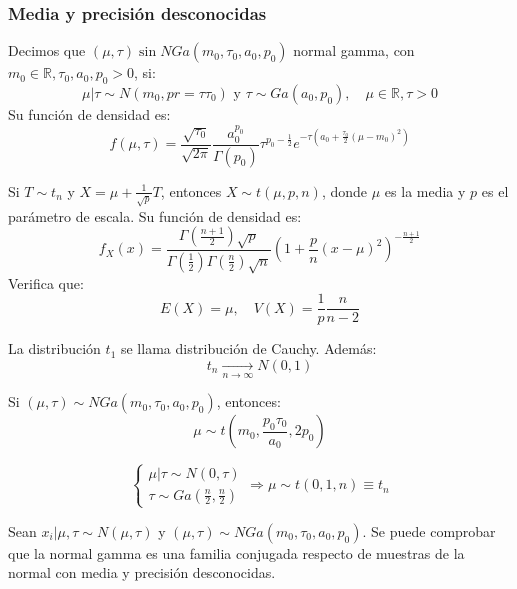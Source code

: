 \subsubsection*{Media y precisión desconocidas}
\begin{definition}
    Decimos que $(\mu, \tau) \sin NGa(m_0, \tau_0, a_0, p_0)$ normal gamma, con $m_0 \in \mathbb{R}, \tau_0, a_0, p_0 > 0$, si:
    $$\mu|\tau \sim N(m_0, pr = \tau\tau_0) \text{ y } \tau \sim Ga(a_0, p_0), \quad \mu \in \mathbb{R}, \tau > 0$$
    Su función de densidad es:
    $$f(\mu, \tau) = \frac{\sqrt{\tau_0}}{\sqrt{2\pi}} \frac{a_0^{p_0}}{\Gamma(p_0)} \tau^{p_0 - \frac{1}{2}} e^{-\tau \left(a_0 + \frac{\tau_0}{2}(\mu-m_0)^2\right)}$$
\end{definition}

\begin{definition}
    Si $T \sim t_n$ y $X = \mu + \frac{1}{\sqrt{p}}T$, entonces $X \sim t(\mu, p, n)$, donde $\mu$ es la media y $p$ es el parámetro de escala.
    Su función de densidad es:
    $$f_X(x) = \frac{\Gamma\left(\frac{n+1}{2}\right)\sqrt{p}}{\Gamma\left(\frac{1}{2}\right)\Gamma\left(\frac{n}{2}\right)\sqrt{n}} \left(1 + \frac{p}{n}(x-\mu)^2\right)^{-\frac{n+1}{2}}$$
    Verifica que:
    $$E(X) = \mu, \quad V(X) = \frac{1}{p} \frac{n}{n-2}$$
\end{definition}

\begin{remark}
    La distribución $t_1$ se llama distribución de Cauchy.
    Además:
    $$t_n \xrightarrow[n \to \infty]{} N(0, 1)$$
\end{remark}

\begin{theorem}
    Si $(\mu, \tau) \sim NGa(m_0, \tau_0, a_0, p_0)$, entonces:
    $$\mu \sim t\left(m_0, \frac{p_0\tau_0}{a_0}, 2p_0\right)$$
\end{theorem}

\begin{corollary}
    $$\begin{cases}
            \mu|\tau \sim N(0, \tau) \\
            \tau \sim Ga\left(\frac{n}{2}, \frac{n}{2}\right)
        \end{cases} \Rightarrow \mu \sim t(0, 1, n) \equiv t_n$$
\end{corollary}

Sean $x_i|\mu, \tau \sim N(\mu, \tau)$ y $(\mu, \tau) \sim NGa(m_0, \tau_0, a_0, p_0)$.
Se puede comprobar que la normal gamma es una familia conjugada respecto de muestras de la normal con media y precisión desconocidas.

